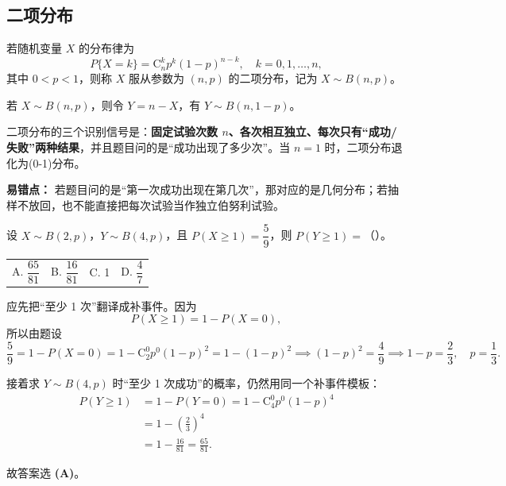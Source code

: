 ﻿\documentclass[lang=cn,11pt]{elegantbook}
\begin{document}
\subsection{二项分布} \label{subsec:binomial-dist}
\begin{definition}[二项分布]\label{def:binomial-dist}
若随机变量 $X$ 的分布律为
\[
P\{X = k\} = \mathrm{C}_n^k p^k (1-p)^{n-k},\quad k=0,1,\dots,n,
\]
其中 $0 < p < 1$，则称 $X$ 服从参数为 $(n,p)$ 的二项分布，记为 $X \sim B(n,p)$。
\end{definition}

\begin{property}\label{prop:binomial-trans}
若 $X \sim B(n,p)$，则令 $Y = n - X$，有 $Y \sim B(n,1-p)$。
\end{property}

\begin{note}
二项分布的三个识别信号是：\textbf{固定试验次数 \(n\)、各次相互独立、每次只有“成功/失败”两种结果}，并且题目问的是“成功出现了多少次”。当 \(n=1\) 时，二项分布退化为(0-1)分布。

\textbf{易错点：} 若题目问的是“第一次成功出现在第几次”，那对应的是几何分布；若抽样不放回，也不能直接把每次试验当作独立伯努利试验。
\end{note}

\begin{exercise}[二项分布参数求解] \label{exer:2-33}
设 $X\sim B(2,p)$，$Y\sim B(4,p)$，且 $P(X\geqslant1)=\dfrac{5}{9}$，则 $P(Y\geqslant1)=$（\quad）。
\begin{tabular}{llll}
A. $\dfrac{65}{81}$ & B. $\dfrac{16}{81}$ & C. 1 & D. $\dfrac{4}{7}$
\end{tabular}
\end{exercise}
\begin{solution}
应先把“至少 1 次”翻译成补事件。因为
\[
P(X\geqslant1)=1-P(X=0),
\]
所以由题设
\[
\frac{5}{9}=1-P(X=0)=1-\mathrm{C}_2^0p^0(1-p)^2=1-(1-p)^2
\implies (1-p)^2=\frac{4}{9}\implies 1-p=\frac{2}{3},\quad p=\frac{1}{3}.
\]

接着求 \(Y\sim B(4,p)\) 时“至少 1 次成功”的概率，仍然用同一个补事件模板：
\[
\begin{aligned}
P(Y\geqslant1)
&=1-P(Y=0)=1-\mathrm{C}_4^0p^0(1-p)^4\\
&=1-\left(\frac{2}{3}\right)^4\\
&=1-\frac{16}{81}
=\frac{65}{81}.
\end{aligned}
\]

故答案选 \textbf{(A)}。
\end{solution}
\end{document}
